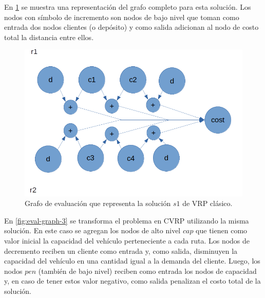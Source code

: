 En \ref{fig:eval-graph-2} se muestra una representación del grafo completo para esta solución. Los nodos con símbolo de incremento son nodos de bajo nivel que toman como entrada dos nodos clientes (o depósito) y como salida adicionan al nodo de costo total la distancia entre ellos.

\begin{figure}
	\centering
	\includegraphics[width=0.9\linewidth]{Graphics/eval-graph-2}
	\caption{Grafo de evaluación que representa la solución $s1$ de VRP clásico.}
	\label{fig:eval-graph-2}
\end{figure}

En \ref{fig:eval-graph-3} se transforma el problema en CVRP utilizando la misma solución. En este caso se agregan los nodos de alto nivel $cap$ que tienen como valor inicial la capacidad del vehículo perteneciente a cada ruta. Los nodos de decremento reciben un cliente como entrada y, como salida, disminuyen la capacidad del vehículo en una cantidad igual a la demanda del cliente. Luego, los nodos $pen$ (también de bajo nivel) reciben como entrada los nodos de capacidad y, en caso de tener estos valor negativo, como salida penalizan el costo total de la solución.

